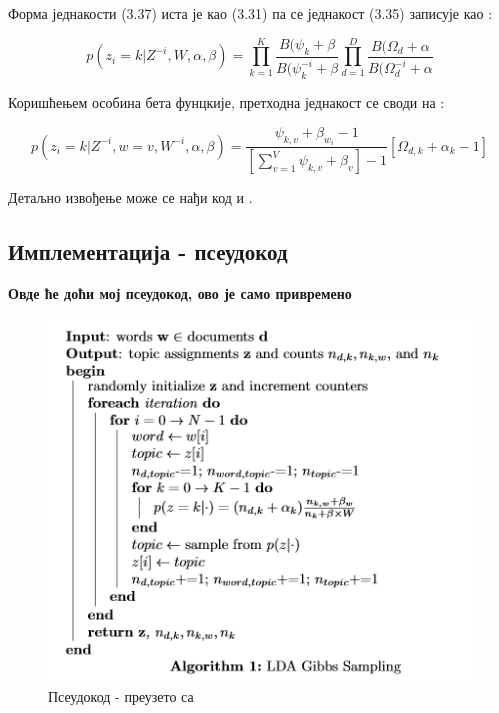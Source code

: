 Форма једнакости (3.37) иста је као (3.31) па се једнакост (3.35) записује као :

\begin{equation}
p(z_i=k|Z^{-i},W,\alpha,\beta) = \prod_{k=1}^K\frac{B(\psi_k + \beta}{B(\psi_k^{-i}+\beta}\prod_{d=1}^D\frac{B(\Omega_d + \alpha}{B(\Omega_d^{-i} + \alpha}
\end{equation}

Коришћењем особина бета фунцкије, претходна једнакост се своди на :

\begin{equation}
p(z_i=k|Z^{-i},w=v,W^{-i},\alpha,\beta) = \frac{\psi_{k,v}+\beta_{w_i}-1}{\left[ \sum_{v=1}^V \psi_{k,v}+\beta_v \right] -1}\left[\Omega_{d,k}+\alpha_k-1 \right]
\end{equation}

Детаљно извођење може се нађи код \cite{verov9} и \cite{verov10}.

\subsection{Имплементација - псеудокод}
\textbf{Овде ће доћи мој псеудокод, ово је само привремено}
%
\begin{figure}[H]
  \includegraphics[scale=0.8]{./Slike/slika30.png} 
  \caption{Псеудокод - преузето са \cite{verov10} }\label{fig:slika27}
\end{figure}

